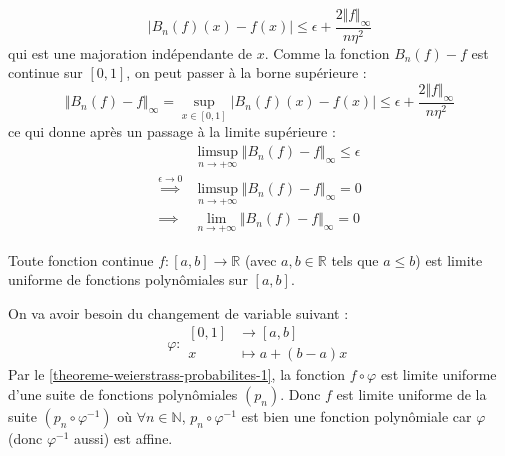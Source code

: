 \begin{demonstration}
		\[ |B_n(f)(x) - f(x)| \leq \epsilon + \frac{2 \Vert f \Vert_\infty}{n \eta^2} \]
		qui est une majoration indépendante de $x$. Comme la fonction $B_n(f) - f$ est continue sur $[0, 1]$, on peut passer à la borne supérieure :
		\[ \Vert B_n(f) - f \Vert_\infty = \sup_{x \in [0, 1]} |B_n(f)(x) - f(x)| \leq \epsilon + \frac{2 \Vert f \Vert_\infty}{n \eta^2} \]
		ce qui donne après un passage à la limite supérieure :
		\begin{align*}
			&\limsup_{n \rightarrow +\infty} \Vert B_n(f) - f \Vert_\infty \leq \epsilon \\
			\overset{\epsilon \longrightarrow 0}{\implies} &\limsup_{n \rightarrow +\infty} \Vert B_n(f) - f \Vert_\infty = 0 \\
			\implies &\lim_{n \rightarrow +\infty} \Vert B_n(f) - f \Vert_\infty = 0
		\end{align*}
	\end{demonstration}

	\begin{theorem}[Weierstrass]
		Toute fonction continue $f : [a,b] \rightarrow \mathbb{R}$ (avec $a, b \in \mathbb{R}$ tels que $a \leq b$) est limite uniforme de fonctions polynômiales sur $[a, b]$.
	\end{theorem}

	\begin{demonstration}
		On va avoir besoin du changement de variable suivant :
		\[ \varphi :
		\begin{array}{cl}
			[0,1] &\rightarrow [a, b] \\
			x &\mapsto a + (b-a) x
		\end{array}
		\]
		Par le \cref{theoreme-weierstrass-probabilites-1}, la fonction $f \circ \varphi$ est limite uniforme d'une suite de fonctions polynômiales $(p_n)$. Donc $f$ est limite uniforme de la suite $(p_n \circ \varphi^{-1})$ où $\forall n \in \mathbb{N}$, $p_n \circ \varphi^{-1}$ est bien une fonction polynômiale car $\varphi$ (donc $\varphi^{-1}$ aussi) est affine.
	\end{demonstration}

